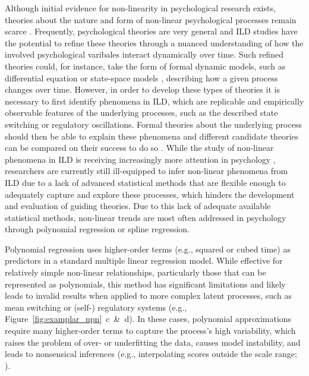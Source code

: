 \documentclass[man, floatsintext]{apa7}
\begin{document}
Although initial evidence for non-linearity in psychological research exists,
theories about the nature and form of non-linear psychological processes remain
scarce \parencite{tan_time-varying_2011}. Frequently, psychological theories
are very general \parencite{oberauer_addressing_2019} and ILD studies have the
potential to refine these theories through a nuanced understanding of how the
involved psychological varibales interact dynamically over time. Such
refined theories could, for instance, take the form of formal dynamic models,
such as differential equation \parencite{cooper_dynamical_2012} or state-space
models \parencite{durbin_time_2012}, describing how a given process changes
over time. However, in order to develop these types of
theories it is necessary to first identify phenomena in ILD, which are
replicable and empirically observable features of the underlying processes,
such as the described state switching or regulatory oscillations. Formal
theories about the underlying process should then be able to explain these
phenomena and different candidate theories can be compared on their success
to do so \parencite{borsboom_theory_2021}. While the study of non-linear
phenomena in ILD is receiving increasingly more attention in psychology
\parencite{cui_unlocking_2023,humberg_estimating_2024},
researchers are currently still ill-equipped to infer non-linear
phenomena from ILD due to a lack of advanced statistical methods that are
flexible enough to adequately capture and explore these processes, which
hinders the development and evaluation of guiding theories.
Due to this lack of adequate available statistical methods,
non-linear trends are most often addressed in psychology through polynomial
regression or spline regression.

Polynomial regression \parencite{jebb_time_2015} uses higher-order terms
(e.g., squared or cubed time) as predictors in a standard multiple linear
regression model. While effective for relatively simple non-linear
relationships,
particularly those that can be represented as polynomials, this method has
significant limitations and likely leads to invalid results when applied to
more complex latent processes, such as mean switching or (self-) regulatory
systems (e.g., Figure~\ref{fig:examplar_npn}~c~\&~d). In these cases,
polynomial approximations require many higher-order
terms to capture the process's high variability, which raises the problem of
over- or underfitting the data, causes model instability, and leads to
nonsensical inferences (e.g., interpolating scores outside the scale range;
\textcite{boyd_divergence_2009,harrell_general_2001}).
\end{document}

